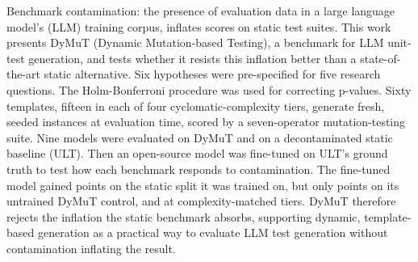 Benchmark contamination: the presence of evaluation data in a large language model's (LLM) training corpus, inflates scores on static test suites. This work presents DyMuT (Dynamic Mutation-based Testing), a benchmark for LLM unit-test generation, and tests whether it resists this inflation better than a state-of-the-art static alternative. Six hypotheses were pre-specified for five research questions. The Holm-Bonferroni procedure was used for correcting p-values. Sixty templates, fifteen in each of four cyclomatic-complexity tiers, generate fresh, seeded instances at evaluation time, scored by a seven-operator mutation-testing suite. Nine models were evaluated on DyMuT and on a decontaminated static baseline (ULT). Then an open-source model was fine-tuned on ULT's ground truth to test how each benchmark responds to contamination. The fine-tuned model gained \HTwoSeenGain{} points on the static split it was trained on, but only \HTwoLOneLThreeGain{} points on its untrained DyMuT control, and \HTwoLFourGain{} at complexity-matched tiers. DyMuT therefore rejects the inflation the static benchmark absorbs, supporting dynamic, template-based generation as a practical way to evaluate LLM test generation without contamination inflating the result.
